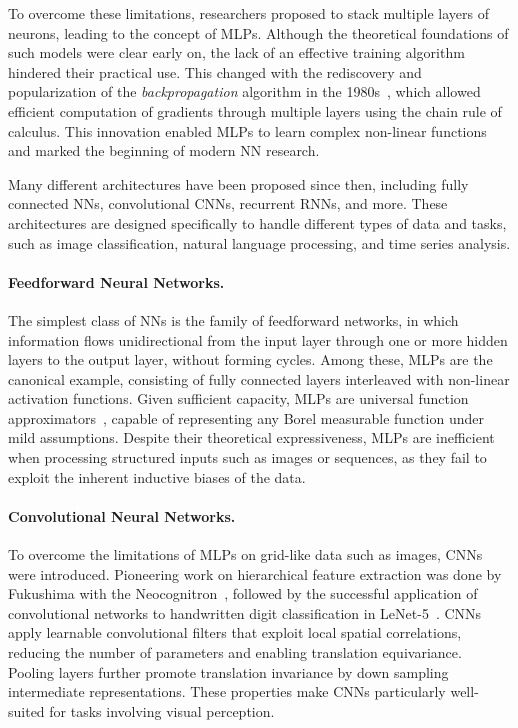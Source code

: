 To overcome these limitations, researchers proposed to stack multiple layers of neurons, leading to the concept of \glspl{MLP}.
%
Although the theoretical foundations of such models were clear early on, the lack of an effective training algorithm hindered their practical use.
%
This changed with the rediscovery and popularization of the \textit{backpropagation} algorithm in the 1980s~\cite{rumelhart1986learning}, which allowed efficient computation of gradients through multiple layers using the chain rule of calculus.
%
This innovation enabled \glspl{MLP} to learn complex non-linear functions and marked the beginning of modern \gls{NN} research.

Many different architectures have been proposed since then, including fully connected \glspl{NN}, convolutional \glspl{CNN}, recurrent \glspl{RNN}, and more.
%
These architectures are designed specifically to handle different types of data and tasks, such as image classification, natural language processing, and time series analysis.

\paragraph{Feedforward Neural Networks.}
%
The simplest class of \glspl{NN} is the family of feedforward networks, in which information flows unidirectional from the input layer through one or more hidden layers to the output layer, without forming cycles.
%
Among these, \glspl{MLP} are the canonical example, consisting of fully connected layers interleaved with non-linear activation functions.
%
Given sufficient capacity, \glspl{MLP} are universal function approximators~\cite{hornik1989multilayer}, capable of representing any Borel measurable function under mild assumptions.
%
Despite their theoretical expressiveness, \glspl{MLP} are inefficient when processing structured inputs such as images or sequences, as they fail to exploit the inherent inductive biases of the data.

\paragraph{Convolutional Neural Networks.}
%
To overcome the limitations of \glspl{MLP} on grid-like data such as images, \glspl{CNN} were introduced.
%
Pioneering work on hierarchical feature extraction was done by Fukushima with the Neocognitron~\cite{fukushima1980neocognitron}, followed by the successful application of convolutional networks to handwritten digit classification in LeNet-5~\cite{lecun1998gradient}.
%
\glspl{CNN} apply learnable convolutional filters that exploit local spatial correlations, reducing the number of parameters and enabling translation equivariance.
%
Pooling layers further promote translation invariance by down sampling intermediate representations.
%
These properties make \glspl{CNN} particularly well-suited for tasks involving visual perception.

